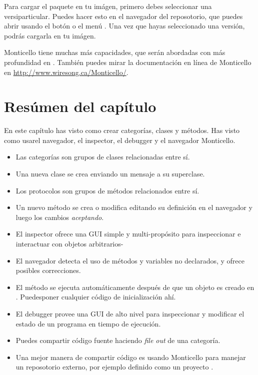\documentclass[a4paper,10pt,twoside]{book}
\begin{document}

Para cargar el paquete en tu im\'agen, primero debes seleccionar una versi\on particular. Puedes hacer esto en el navegador del reposotorio, que puedes abrir usando el bot\'on  o el men\'u \actclick. Una vez que hayas seleccionado una versi\'on, podr\'as cargarla en tu im\'agen.


Monticello tiene muchas m\'as capacidades, que ser\'an abordadas con m\'as profundidad en .
Tambi\'en puedes mirar la documentaci\'on en l\'inea de Monticello en \url{http://www.wiresong.ca/Monticello/}.

\section{Res\'umen del cap\'itulo}
En este cap\'itulo has visto como crear categor\'ias, clases y m\'etodos. Has visto como usarel navegador, el inspector, el debugger y el navegador Monticello.

\begin{itemize}
  \item Las categor\'ias son grupos de clases relacionadas entre s\'i.
  \item Una nueva clase se crea enviando un mensaje a su superclase.
  \item Los protocolos son grupos de m\'etodos relacionados entre s\'i.
  \item Un nuevo m\'etodo se crea o modifica editando su definici\'on en el navegador y luego los cambios \emph{aceptando}.
  \item El inspector ofrece una GUI simple y multi-prop\'osito para inspeccionar e interactuar con objetos arbitrarios-
  \item El navegador detecta el uso de m\'etodos y variables no declarados, y ofrece posibles correcciones.
  \item El m\'etodo  se ejecuta autom\'aticamente despu\'es de que un objeto es creado en \pharo. Puedesponer cualquier c\'odigo de inicializaci\'on ah\'i.
  \item El debugger provee una GUI de alto nivel para inspeccionar y modificar el estado de un programa en tiempo de ejecuci\'on.
  \item Puedes compartir c\'odigo fuente haciendo \emph{file out} de una categor\'ia.
  \item Una mejor manera de compartir c\'odigo es usando Monticello para manejar un reposotorio externo, por ejemplo definido como un proyecto \sqsrc.
\end{itemize}

\ifx\wholebook\relax\else
\end{document}
